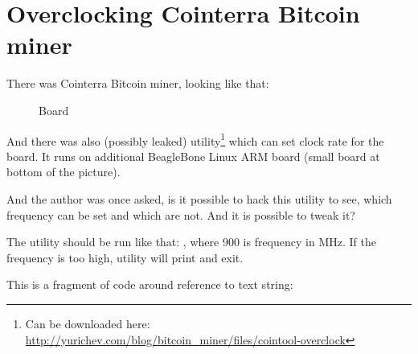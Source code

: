 \section{Overclocking Cointerra Bitcoin miner}

There was Cointerra Bitcoin miner, looking like that:

\begin{figure}[H]
\centering
{}
\caption{Board}
\end{figure}

And there was also (possibly leaked) utility\footnote{Can be downloaded here: \url{http://yurichev.com/blog/bitcoin_miner/files/cointool-overclock}}
which can set clock rate for the board.
It runs on additional BeagleBone Linux ARM board (small board at bottom of the picture).

And the author was once asked, is it possible to hack this utility to see, which frequency can be set and which are not.
And it is possible to tweak it?

The utility should be run like that: , where 900 is frequency in MHz.
If the frequency is too high, utility will print  and exit.

This is a fragment of code around reference to  text string:

